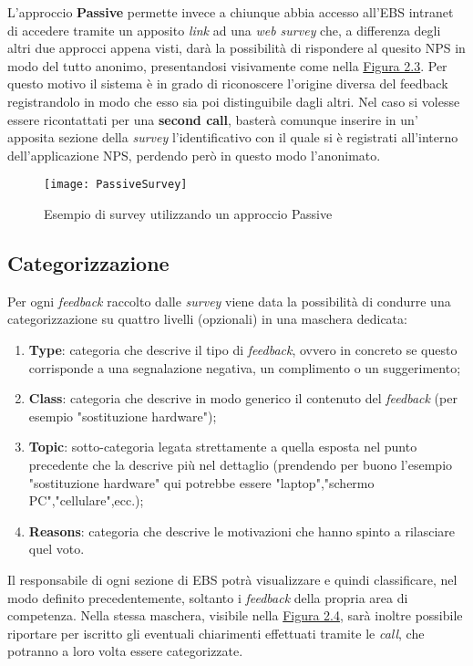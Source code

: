 L'approccio \textbf{Passive} permette invece a chiunque abbia accesso all'EBS \gls{intranet} di accedere tramite un apposito \textit{link} ad una \textit{web survey} che, a differenza degli altri due approcci appena visti, darà la possibilità di rispondere al quesito NPS in modo del tutto anonimo, presentandosi visivamente come nella \hyperref[Passive]{Figura 2.3}. Per questo motivo il sistema è in grado di riconoscere l'origine diversa del feedback registrandolo in modo che esso sia poi distinguibile dagli altri. Nel caso si volesse essere ricontattati per una \textbf{second call}, basterà comunque inserire in un' apposita sezione della \textit{survey} l'identificativo con il quale si è registrati all'interno dell'applicazione NPS, perdendo però in questo modo l'anonimato. 

\begin{figure}[ht]
\begin{center}
\texttt{[image: PassiveSurvey]}
\caption{Esempio di survey utilizzando un approccio Passive}
\label{Passive}
\end{center}
\end{figure}
\FloatBarrier

\subsection{Categorizzazione}

Per ogni \textit{feedback} raccolto dalle \textit{survey} viene data la possibilità di condurre una categorizzazione su quattro livelli (opzionali) in una maschera dedicata:\begin{enumerate}
\item \textbf{Type}: categoria che descrive il tipo di \textit{feedback}, ovvero in concreto se questo corrisponde a una segnalazione negativa, un complimento o un suggerimento;
\item \textbf{Class}: categoria che descrive in modo generico il contenuto del \textit{feedback} (per esempio "sostituzione hardware");
\item \textbf{Topic}: sotto-categoria legata strettamente a quella esposta nel punto precedente che la descrive più nel dettaglio (prendendo per buono l'esempio "sostituzione hardware" qui potrebbe essere "laptop","schermo PC","cellulare",ecc.);
\item \textbf{Reasons}: categoria che descrive le motivazioni che hanno spinto a rilasciare quel voto.
\end{enumerate}
Il responsabile di ogni sezione di EBS potrà visualizzare e quindi classificare, nel modo definito precedentemente, soltanto i \textit{feedback} della propria area di competenza. Nella stessa maschera, visibile nella \hyperref[Categorization]{Figura 2.4}, sarà inoltre possibile riportare per iscritto gli eventuali chiarimenti effettuati tramite le \textit{call}, che potranno a loro volta essere categorizzate.

